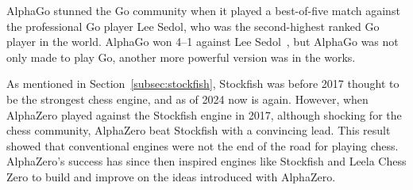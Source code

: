 AlphaGo stunned the Go community when it played a best-of-five match against the professional
Go player Lee Sedol, who was the second-highest ranked Go player in the world.
AlphaGo won 4--1 against Lee Sedol~\cite{alpha-go-zero}, but AlphaGo was not only made to play Go, another more powerful
version was in the works.

As mentioned in Section~\ref{subsec:stockfish}, Stockfish was before 2017 thought to be the strongest chess engine,
and as of 2024 now is again.
However, when AlphaZero played against the Stockfish engine in 2017, although shocking for the chess community,
AlphaZero beat Stockfish with a convincing lead.
This result showed that conventional engines were not the end of the road for playing chess.
AlphaZero's success has since then inspired engines like Stockfish and Leela Chess Zero to build and improve on the
ideas introduced with AlphaZero.
